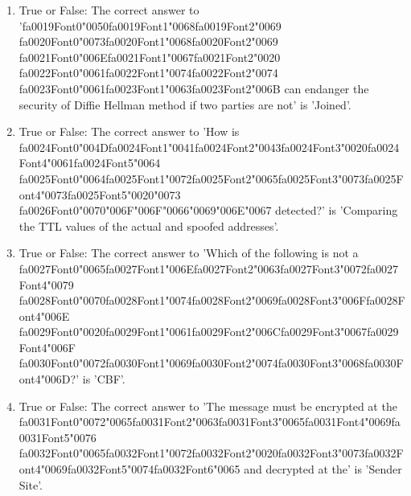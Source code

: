 \documentclass[12pt]{article}
\begin{document}
\begin{enumerate}[label=\arabic*.]
\item True or False: The correct answer to '{\csname fa0019Font0\endcsname\char"0050}{\csname fa0019Font1\endcsname\char"0068}{\csname fa0019Font2\endcsname\char"0069} {\csname fa0020Font0\endcsname\char"0073}{\csname fa0020Font1\endcsname\char"0068}{\csname fa0020Font2\endcsname\char"0069} {\csname fa0021Font0\endcsname\char"006E}{\csname fa0021Font1\endcsname\char"0067}{\csname fa0021Font2\endcsname\char"0020} {\csname fa0022Font0\endcsname\char"0061}{\csname fa0022Font1\endcsname\char"0074}{\csname fa0022Font2\endcsname\char"0074} {\csname fa0023Font0\endcsname\char"0061}{\csname fa0023Font1\endcsname\char"0063}{\csname fa0023Font2\endcsname\char"006B} can endanger the security of Diffie Hellman method if two parties are not' is 'Joined'.
\item True or False: The correct answer to 'How is {\csname fa0024Font0\endcsname\char"004D}{\csname fa0024Font1\endcsname\char"0041}{\csname fa0024Font2\endcsname\char"0043}{\csname fa0024Font3\endcsname\char"0020}{\csname fa0024Font4\endcsname\char"0061}{\csname fa0024Font5\endcsname\char"0064} {\csname fa0025Font0\endcsname\char"0064}{\csname fa0025Font1\endcsname\char"0072}{\csname fa0025Font2\endcsname\char"0065}{\csname fa0025Font3\endcsname\char"0073}{\csname fa0025Font4\endcsname\char"0073}{\csname fa0025Font5\endcsname\char"0020}{\char"0073} {\csname fa0026Font0\endcsname\char"0070}{\char"006F}{\char"006F}{\char"0066}{\char"0069}{\char"006E}{\char"0067} detected?' is 'Comparing the TTL values of the actual and spoofed addresses'.
\item True or False: The correct answer to 'Which of the following is not a {\csname fa0027Font0\endcsname\char"0065}{\csname fa0027Font1\endcsname\char"006E}{\csname fa0027Font2\endcsname\char"0063}{\csname fa0027Font3\endcsname\char"0072}{\csname fa0027Font4\endcsname\char"0079} {\csname fa0028Font0\endcsname\char"0070}{\csname fa0028Font1\endcsname\char"0074}{\csname fa0028Font2\endcsname\char"0069}{\csname fa0028Font3\endcsname\char"006F}{\csname fa0028Font4\endcsname\char"006E} {\csname fa0029Font0\endcsname\char"0020}{\csname fa0029Font1\endcsname\char"0061}{\csname fa0029Font2\endcsname\char"006C}{\csname fa0029Font3\endcsname\char"0067}{\csname fa0029Font4\endcsname\char"006F} {\csname fa0030Font0\endcsname\char"0072}{\csname fa0030Font1\endcsname\char"0069}{\csname fa0030Font2\endcsname\char"0074}{\csname fa0030Font3\endcsname\char"0068}{\csname fa0030Font4\endcsname\char"006D}?' is 'CBF'.
\item True or False: The correct answer to 'The message must be encrypted at the {\csname fa0031Font0\endcsname\char"0072}{\char"0065}{\csname fa0031Font2\endcsname\char"0063}{\csname fa0031Font3\endcsname\char"0065}{\csname fa0031Font4\endcsname\char"0069}{\csname fa0031Font5\endcsname\char"0076} {\csname fa0032Font0\endcsname\char"0065}{\csname fa0032Font1\endcsname\char"0072}{\csname fa0032Font2\endcsname\char"0020}{\csname fa0032Font3\endcsname\char"0073}{\csname fa0032Font4\endcsname\char"0069}{\csname fa0032Font5\endcsname\char"0074}{\csname fa0032Font6\endcsname\char"0065} and decrypted at the' is 'Sender Site'.

\end{enumerate}
\end{document}
